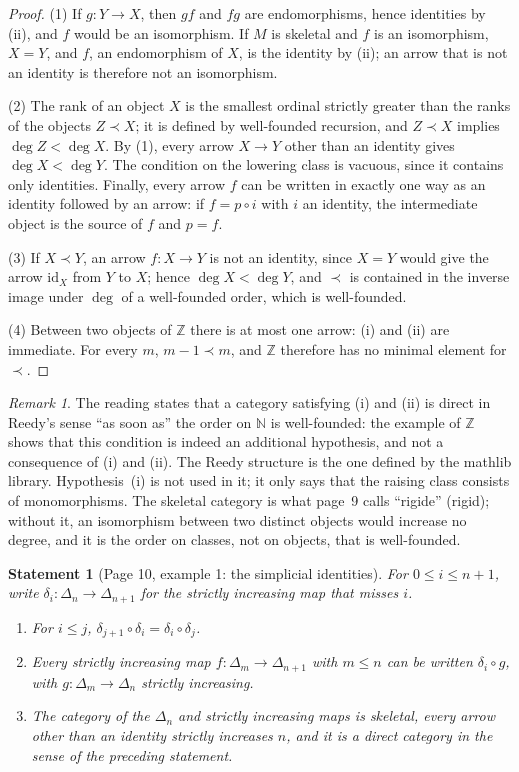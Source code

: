 \documentclass[11pt]{article}
\newcommand{\q}[1]{“#1”}
\newcommand{\fr}[1]{\textfrench{#1}}
\theoremstyle{plain}
\newtheorem*{enonce}{Statement}
\theoremstyle{definition}
\theoremstyle{remark}
\newtheorem*{remarque}{Remark}
\begin{document}
\begin{proof}
(1) If $g : Y \to X$, then $gf$ and $fg$ are endomorphisms, hence identities by (ii), and $f$ would be an isomorphism. If $M$ is skeletal and $f$ is an isomorphism, $X = Y$, and $f$, an endomorphism of $X$, is the identity by (ii); an arrow that is not an identity is therefore not an isomorphism.

(2) The rank of an object $X$ is the smallest ordinal strictly greater than the ranks of the objects $Z \prec X$; it is defined by well-founded recursion, and $Z \prec X$ implies $\deg Z < \deg X$. By (1), every arrow $X \to Y$ other than an identity gives $\deg X < \deg Y$. The condition on the lowering class is vacuous, since it contains only identities. Finally, every arrow $f$ can be written in exactly one way as an identity followed by an arrow: if $f = p \circ i$ with $i$ an identity, the intermediate object is the source of $f$ and $p = f$.

(3) If $X \prec Y$, an arrow $f : X \to Y$ is not an identity, since $X = Y$ would give the arrow $\mathrm{id}_X$ from $Y$ to $X$; hence $\deg X < \deg Y$, and $\prec$ is contained in the inverse image under $\deg$ of a well-founded order, which is well-founded.

(4) Between two objects of $\mathbb Z$ there is at most one arrow: (i) and (ii) are immediate. For every $m$, $m - 1 \prec m$, and $\mathbb Z$ therefore has no minimal element for $\prec$.
\end{proof}

\begin{remarque}
The reading states that a category satisfying (i) and (ii) is direct in Reedy's sense \q{as soon as} the order on $\mathbb N$ is well-founded: the example of $\mathbb Z$ shows that this condition is indeed an additional hypothesis, and not a consequence of (i) and (ii). The Reedy structure is the one defined by the mathlib library. Hypothesis~(i) is not used in it; it only says that the raising class consists of monomorphisms. The skeletal category is what page~9 calls \q{\fr{rigide}} (rigid); without it, an isomorphism between two distinct objects would increase no degree, and it is the order on classes, not on objects, that is well-founded.
\end{remarque}

\begin{enonce}[Page 10, example 1: the simplicial identities]
For $0 \leq i \leq n + 1$, write $\delta_i : \Delta_n \to \Delta_{n+1}$ for the strictly increasing map that misses $i$.
\begin{enumerate}
\item For $i \leq j$, $\delta_{j+1} \circ \delta_i = \delta_i \circ \delta_j$.
\item Every strictly increasing map $f : \Delta_m \to \Delta_{n+1}$ with $m \leq n$ can be written $\delta_i \circ g$, with $g : \Delta_m \to \Delta_n$ strictly increasing.
\item The category of the $\Delta_n$ and strictly increasing maps is skeletal, every arrow other than an identity strictly increases $n$, and it is a direct category in the sense of the preceding statement.
\end{enumerate}
\end{enonce}
\end{document}
